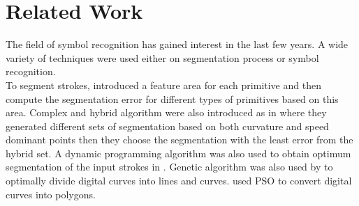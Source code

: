 \documentclass[a4paper,10pt]{IEEEconf}
\begin{document}
\section{Related Work}
The field of symbol recognition has gained interest in the last few years. A wide variety of techniques were used either on segmentation process or symbol recognition.\\ 
To segment strokes, \cite{meanshift10} introduced a feature area for each primitive and then compute the segmentation error for different types of primitives based on this area. %
Complex and hybrid algorithm were also introduced as in  \cite{earlyprocess} where they generated different sets of segmentation based on both curvature and speed dominant points then they choose the segmentation with the least error from the hybrid set. A dynamic programming algorithm was also used to obtain optimum segmentation of the input strokes in \cite{GeometryAndDomain102}. Genetic algorithm was also used by \cite{CruveDivisionSwarm} to optimally divide digital curves into lines and curves. \cite{PolygonApproximationPSO} used PSO to convert digital curves into polygons.  \\

\end{document}
